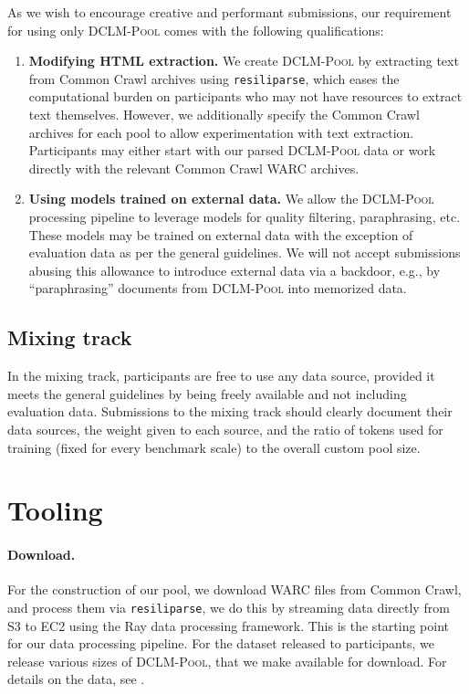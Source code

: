 \documentclass{article}
\newcommand{\rawpool}{\textsc{DCLM-Pool}\xspace}
\newcommand{\resiliparse}{\texttt{resiliparse}\xspace}
\newcommand{\commoncrawl}{Common Crawl\xspace}
\begin{document}
As we wish to encourage creative and performant submissions, our requirement for using only \rawpool comes with the following qualifications:
\begin{enumerate}
    \item \textbf{Modifying HTML extraction.}
    We create \rawpool by extracting text from \commoncrawl archives using \resiliparse, which eases the computational burden on participants who may not have resources to extract text themselves.
    However, we additionally specify the \commoncrawl archives for each pool to allow experimentation with text extraction. Participants may either start with our parsed \rawpool data or work directly with the relevant \commoncrawl WARC archives.
    \item \textbf{Using models trained on external data.} We allow the \rawpool processing pipeline to leverage models for quality filtering, paraphrasing, etc. These models may be trained on external data with the exception of evaluation data as per the general guidelines.
    We will not accept submissions abusing this allowance to introduce external data via a backdoor, e.g., by ``paraphrasing'' documents from \rawpool into memorized data.
\end{enumerate}

\subsection{Mixing track}
In the mixing track, participants are free to use any data source, provided it meets the general guidelines by being freely available and not including evaluation data. Submissions to the mixing track should clearly document their data sources, the weight given to each source, and the ratio of tokens used for training (fixed for every benchmark scale) to the overall custom pool size.

\section{Tooling}\label{appx:tooling}

\paragraph{Download.} For the construction of our pool, we download WARC files from \commoncrawl, and process them via \resiliparse, we do this by streaming data directly from S3 to EC2 using the Ray data processing framework.
This is the starting point for our data processing pipeline.
For the dataset released to participants, we release various sizes of \rawpool, that we make available for download. For details on the data, see .
\end{document}
